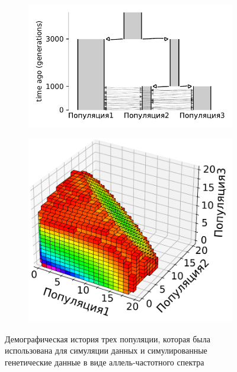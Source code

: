 \begin{figure}[ht]
    \centering
    \begin{subfigure}[b]{.5\textwidth}
    \includegraphics[width=\textwidth]{images_experiments/simulation_1/3pop/picture_1pop_model_ground_truth_grey}
    \caption{}
    \label{fig:part2:experiments:simulated_3:data_1}
    \end{subfigure}%
    \begin{subfigure}[b]{.4\textwidth}
    \includegraphics[width=\textwidth]{images_experiments/simulation_1/3pop/3d_plot.pdf}
    \caption{}
    \label{fig:part2:experiments:simulated_3:data_2}
    \end{subfigure}
    \caption{Демографическая история трех популяции, которая была использована для симуляции данных и симулированные генетические данные в виде аллель-частотного спектра}
    \label{fig:part2:experiments:simulated_3:data}
\end{figure}

